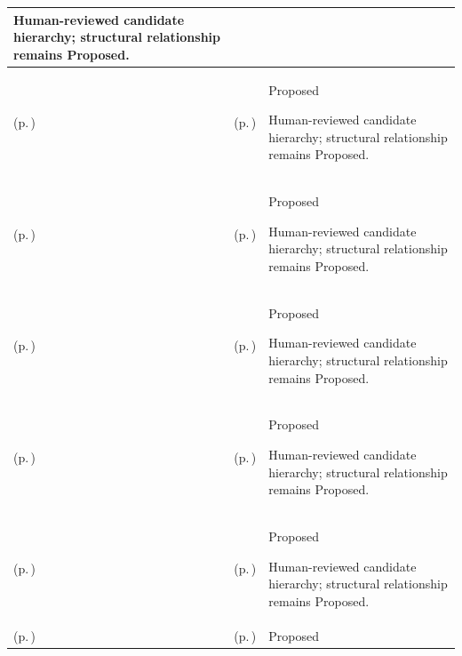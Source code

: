 \begin{longtable}{|>{\raggedright\arraybackslash}p{0.27\TableWidth}|>{\raggedright\arraybackslash}p{0.27\TableWidth}|>{\raggedright\arraybackslash}p{0.46\TableWidth}|}
Human-reviewed candidate hierarchy; structural relationship remains Proposed.\\\hline
\nameref{cap:bec-governed-health-information-enablement} (p.\,\pageref{cap:bec-governed-health-information-enablement}) & \nameref{cap:bec-reviewed-information-asset-stewardship-management} (p.\,\pageref{cap:bec-reviewed-information-asset-stewardship-management}) & Proposed

Human-reviewed candidate hierarchy; structural relationship remains Proposed.\\\hline
\nameref{cap:bec-reviewed-information-asset-stewardship-management} (p.\,\pageref{cap:bec-reviewed-information-asset-stewardship-management}) & \nameref{cap:bec-reviewed-information-asset-definition} (p.\,\pageref{cap:bec-reviewed-information-asset-definition}) & Proposed

Human-reviewed candidate hierarchy; structural relationship remains Proposed.\\\hline
\nameref{cap:bec-reviewed-information-asset-stewardship-management} (p.\,\pageref{cap:bec-reviewed-information-asset-stewardship-management}) & \nameref{cap:bec-reviewed-information-asset-tag-management} (p.\,\pageref{cap:bec-reviewed-information-asset-tag-management}) & Proposed

Human-reviewed candidate hierarchy; structural relationship remains Proposed.\\\hline
\nameref{cap:bec-governed-health-information-enablement} (p.\,\pageref{cap:bec-governed-health-information-enablement}) & \nameref{cap:bec-reviewed-information-content-maintainer-management} (p.\,\pageref{cap:bec-reviewed-information-content-maintainer-management}) & Proposed

Human-reviewed candidate hierarchy; structural relationship remains Proposed.\\\hline
\nameref{cap:bec-reviewed-information-content-maintainer-management} (p.\,\pageref{cap:bec-reviewed-information-content-maintainer-management}) & \nameref{cap:bec-reviewed-data-scientist-administration} (p.\,\pageref{cap:bec-reviewed-data-scientist-administration}) & Proposed

Human-reviewed candidate hierarchy; structural relationship remains Proposed.\\\hline
\nameref{cap:bec-reviewed-information-content-maintainer-management} (p.\,\pageref{cap:bec-reviewed-information-content-maintainer-management}) & \nameref{cap:bec-reviewed-information-product-administration} (p.\,\pageref{cap:bec-reviewed-information-product-administration}) & Proposed


\end{longtable}
